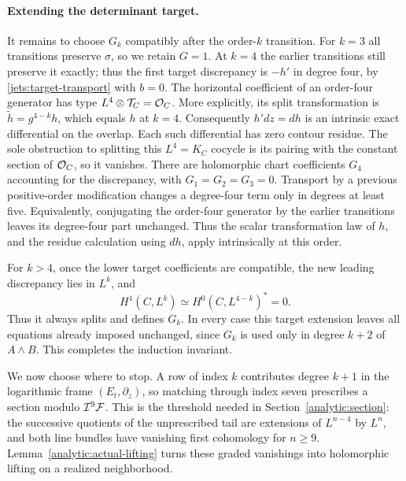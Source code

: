 \paragraph{Extending the determinant target.}
It remains to choose $G_k$ compatibly after the order-$k$ transition.
For $k=3$ all transitions preserve $\sigma$, so we retain $G=1$.
At $k=4$ the earlier transitions still preserve it exactly; thus the
first target discrepancy is $-h'$ in degree four, by
\eqref{jets:target-transport} with $b=0$.
The horizontal coefficient of an order-four generator has type
$L^4\otimes\mathcal T_C=\mathcal O_C$.  More explicitly, its split
transformation is $\widetilde h=g^{4-k}h$, which equals $h$ at
$k=4$.  Consequently $h'dz=dh$ is an intrinsic exact differential
on the overlap.  Each such differential has zero contour residue.
The sole obstruction to splitting this $L^4=K_C$ cocycle is its
pairing with the constant section of $\mathcal O_C$, so it vanishes.
There are holomorphic chart coefficients $G_4$ accounting for the
discrepancy, with $G_1=G_2=G_3=0$.
Transport by a previous positive-order modification changes a
degree-four term only in degrees at least five. Equivalently, conjugating
the order-four generator by the earlier transitions leaves its degree-four
part unchanged. Thus the scalar transformation law of $h$, and the residue
calculation using $dh$, apply intrinsically at this order.

For $k>4$, once the lower target coefficients are compatible, the
new leading discrepancy lies in $L^k$, and
\begin{equation}\label{jets:target-vanishing}
 H^1(C,L^k)\simeq H^0(C,L^{4-k})^*=0.
\end{equation}
Thus it always splits and defines $G_k$.
In every case this target extension leaves all equations already
imposed unchanged, since $G_k$ is used only in degree $k+2$ of
$A\wedge B$.  This completes the induction invariant.

We now choose where to stop.  A row of index $k$ contributes degree
$k+1$ in the logarithmic frame $(E_t,\partial_z)$, so matching through
index seven prescribes a section modulo $\mathcal I^9\mathcal F$.  This is the
threshold needed in Section~\ref{analytic:section}: the successive
quotients of the unprescribed tail are extensions of $L^{n-4}$ by
$L^n$, and both line bundles have vanishing first cohomology for
$n\geq9$.  Lemma~\ref{analytic:actual-lifting} turns these graded
vanishings into holomorphic lifting on a realized neighborhood.


